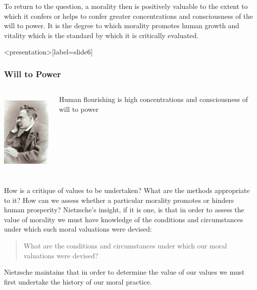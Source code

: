 To return to the question, a morality then is positively valuable to the extent to which it confers or helps to confer greater concentrations and consciousness of the will to power. It is the degree to which morality promotes human growth and vitality which is the standard by which it is critically evaluated. \change

\begin{frame}<presentation>[label=slide6]
    \frametitle{Will to Power}
        \begin{columns}
            \begin{column}{3cm}
                \includegraphics[height=4cm]{../../graphics/nietzsche.jpg}
            \end{column}
            \begin{column}{7cm}
                Human flourishing is high concentrations and consciousness of \alert{will to power}
            \end{column}
        \end{columns}
\end{frame}

How is a critique of values to be undertaken? What are the methods appropriate to it? How can we assess whether a particular morality promotes or hinders human prosperity? Nietzsche's insight, if it is one, is that in order to assess the value of morality we must have knowledge of the conditions and circumstances under which such moral valuations were devised:
\begin{quote}
    What are the conditions and circumstances under which our moral valuations were devised?
\end{quote}
Nietzsche maintains that in order to determine the value of our values we must first undertake the history of our moral practice.

